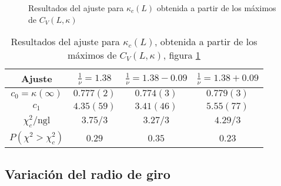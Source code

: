 \begin{figure}[h]
  \centering
  
  \caption{Resultados del ajuste para $\kappa_c(L)$ obtenida a partir de los
  máximos de $C_V(L,\kappa)$}\label{kappa_Cv_fig}
\end{figure}

\begin{table}[h]
\centering
\begin{tabular}{|c|c|c|c|}\hline
 Ajuste              & $\frac{1}{\nu}=1.38$ & $\frac{1}{\nu}=1.38-0.09$& $\frac{1}{\nu}=1.38+0.09$ \\ \hline\hline
 $c_0=\kappa(\infty)$   & $0.777(2) $          &  $0.774(3)$              &  $0.779(3)$   \\ \hline
 $c_1$              & $4.35(59)$           &  $3.41(46)$              &   $5.55(77)$  \\ \hline
 $\chi_c^2/\mathrm{ngl}$       &  $3.75/3$            &  $3.27/3$                & $4.29/3$  \\ \hline
 $P(\chi^2>\chi_c^2)$&  $0.29$              &  $0.35$                  &   $0.23$ \\ \hline
\end{tabular}
\caption{Resultados del ajuste para $\kappa_c(L)$, obtenida a partir de los
  máximos de $C_V(L,\kappa)$, figura \ref{kappa_Cv_fig}}\label{kappa_Cv_tab}
\end{table}
\clearpage

\subsection{Variación del radio de giro}

